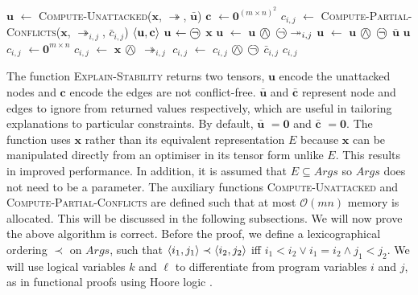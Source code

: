 \begin{algorithm}[H]
	\caption{}
	\begin{algorithmic}[1]
			\State $\mathbf{u}$ $\gets$ \textsc{Compute-Unattacked}($\mathbf{x}$, $\twoheadrightarrow$, $\bar{\mathbf{u}}$)
			\State $\mathbf{c}$ $\gets\mathbf{0}^{(m\times n)^2}$
					\State $c_{i,j}$ $\gets$ \textsc{Compute-Partial-Conflicts}($\mathbf{x}$, $\twoheadrightarrow_{i,j}$, $\bar{c}_{i,j}$)
				\EndFor
			\EndFor			
			\State \Return $\langle{\mathbf{u}},{\mathbf{c}}\rangle$
		\EndFunction
			\State $\mathbf{u}$ $\gets\incircbin{\neg}$ $\mathbf{x}$
						\State $\mathbf{u}$ $\gets$ $\mathbf{u}$ $\incircbin{\land}$ $\incircbin{\neg}\twoheadrightarrow_{i,j}$
					\EndIf
				\EndFor
			\EndFor
			\State $\mathbf{u}$ $\gets$ $\mathbf{u}$ $\incircbin{\land}$ $\incircbin{\neg}$ $\bar{\mathbf{u}}$
			\State \Return $\mathbf{u}$
		\EndFunction
			\State $c_{i,j}$ $\gets\mathbf{0}^{m\times n}$
				\State $c_{i,j}$ $\gets$ $\mathbf{x}$ $\incircbin{\land}$ $\twoheadrightarrow_{i,j}$ 
			\EndIf
			\State $c_{i,j}$ $\gets$ $c_{i,j}$ $\incircbin{\land}$ $\incircbin{\neg}$ $\bar{c}_{i,j}$
			\State \Return $c_{i,j}$
		\EndFunction
	\end{algorithmic}
\end{algorithm}

The function \textsc{Explain-Stability} returns two tensors, $\mathbf{u}$ encode the unattacked nodes and $\mathbf{c}$ encode the edges are not conflict-free. $\bar{\mathbf{u}}$ and $\bar{\mathbf{c}}$ represent node and edges to ignore from returned values respectively, which are useful in tailoring explanations to particular constraints. By default, $\bar{\mathbf{u}}$ $=\mathbf{0}$ and $\bar{\mathbf{c}}$ $=\mathbf{0}$. The function uses $\mathbf{x}$ rather than its equivalent representation $E$ because $\mathbf{x}$ can be manipulated directly from an optimiser in its tensor form unlike $E$. This results in improved performance. In addition, it is assumed that $E\subseteq Args$ so $Args$ does not need to be a parameter.
\linespace
The auxiliary functions \textsc{Compute-Unattacked} and \textsc{Compute-Partial-Conflicts} are defined such that at most $\mathcal{O}(mn)$ memory is allocated. This will be discussed in the following subsections. We will now prove the above algorithm is correct.
\linespace
Before the proof, we define a lexicographical ordering $\prec$ on $Args$, such that $\langle{i_1},{j_1}\rangle\prec\langle{i_2},{j_2}\rangle$ iff $i_1<i_2\lor i_1=i_2\land j_1<j_2$. We will use logical variables $k$ and $\ell$ to differentiate from program variables $i$ and $j$, as in functional proofs using Hoore logic \cite{hoare}.

